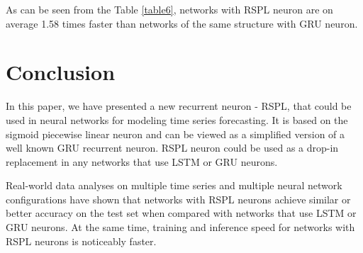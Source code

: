 \documentclass[sn-apa]{sn-jnl}%
\begin{document}
As can be seen from the Table \ref{table6}, networks with RSPL neuron are on average 1.58 times faster than networks of the same structure with GRU neuron.

\section{Conclusion}\label{sec7}
In this paper, we have presented a new recurrent neuron - RSPL, that could be used in neural networks for modeling time series forecasting. It is based on the sigmoid piecewise linear neuron and can be viewed as a simplified version of a well known GRU recurrent neuron. RSPL neuron could be used as a drop-in replacement in any networks that use LSTM or GRU neurons.

Real-world data analyses on multiple time series and multiple neural network configurations have shown that networks with RSPL neurons achieve similar or better accuracy on the test set when compared with networks that use LSTM or GRU neurons. At the same time, training and inference speed for networks with RSPL neurons is noticeably faster.


\end{document}
